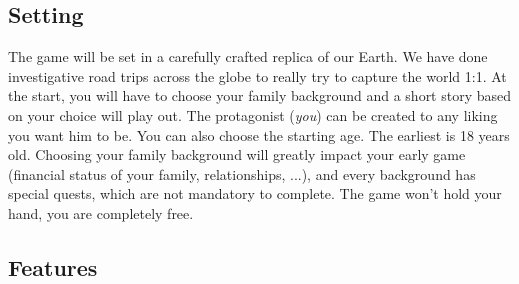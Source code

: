 \documentclass[a4paper,10pt,english]{article}
\begin{document}
\subsection*{Setting}
The game will be set in a carefully crafted replica of our Earth. We have done investigative road trips across the globe to really try to capture the world 1:1. At the start, you will have to choose your family background and a short story based on your choice will play out. The protagonist (\emph{you}) can be created to any liking you want him to be. You can also choose the starting age. The earliest is 18 years old. Choosing your family background will greatly impact your early game (financial status of your family, relationships, ...), and every background has special quests, which are not mandatory to complete. The game won't hold your hand, you are completely free.

\subsection*{Features}
\end{document}
